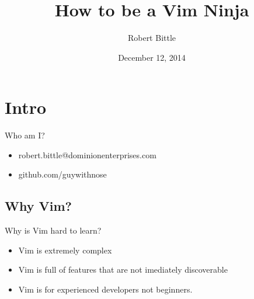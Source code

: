 \documentclass{beamer}
\title[How to be a Vim Ninja]{How to be a Vim Ninja}
\author{Robert Bittle}
\date{December 12, 2014}
\begin{document}
    \begin{frame}
    \titlepage
    \end{frame}


    \section{Intro}
    \begin{frame}{Who am I?}
        \begin{itemize}
            \item robert.bittle@dominionenterprises.com
            \item github.com/guywithnose
        \end{itemize}
    \end{frame}
    \subsection{Why Vim?}
    \begin{frame}{Why is Vim hard to learn?}
        \begin{itemize}
            \item <alert@+> Vim is extremely complex %
            \item <alert@+> Vim is full of features that are not imediately discoverable
            \item <alert@+> Vim is for experienced developers not beginners.
        \end{itemize}
    \end{frame}
\end{document}
